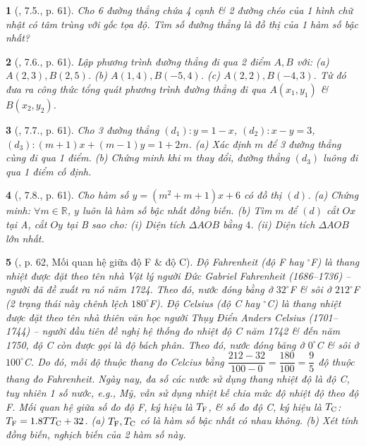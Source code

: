\documentclass{article}
\newtheorem{baitoan}{}
\begin{document}
\begin{baitoan}[\cite{Binh_boi_duong_Toan_9_tap_1}, 7.5., p. 61]
	Cho 6 đường thẳng chứa 4 cạnh \& 2 đường chéo của 1 hình chữ nhật có tâm trùng với gốc tọa độ. Tìm số đường thẳng là đồ thị của 1 hàm số bậc nhất?
\end{baitoan}

\begin{baitoan}[\cite{Binh_boi_duong_Toan_9_tap_1}, 7.6., p. 61]
	Lập phương trình đường thẳng đi qua 2 điểm $A,B$ với: (a) $A(2,3),B(2,5)$. (b) $A(1,4),B(-5,4)$. (c) $A(2,2),B(-4,3)$. Từ đó đưa ra công thức tổng quát phương trình đường thẳng đi qua $A(x_1,y_1)$ \& $B(x_2,y_2)$.
\end{baitoan}

\begin{baitoan}[\cite{Binh_boi_duong_Toan_9_tap_1}, 7.7., p. 61]
	Cho 3 đường thẳng $(d_1):y = 1 - x$, $(d_2):x - y = 3$, $(d_3):(m + 1)x + (m - 1)y = 1 + 2m$. (a) Xác định $m$ để 3 đường thẳng cùng đi qua 1 điểm. (b) Chứng minh khi $m$ thay đổi, đường thẳng $(d_3)$ luông đi qua 1 điểm cố định.
\end{baitoan}

\begin{baitoan}[\cite{Binh_boi_duong_Toan_9_tap_1}, 7.8., p. 61]
	Cho hàm số $y = (m^2 + m + 1)x + 6$ có đồ thị $(d)$. (a) Chứng minh: $\forall m\in\mathbb{R}$, $y$ luôn là hàm số bậc nhất đồng biến. (b) Tìm $m$ để $(d)$ cắt $Ox$ tại A, cắt $Oy$ tại B sao cho: (i) Diện tích $\Delta AOB$ bằng $4$. (ii) Diện tích $\Delta AOB$ lớn nhất.
\end{baitoan}

\begin{baitoan}[\cite{Binh_boi_duong_Toan_9_tap_1}, p. 62, Mối quan hệ giữa độ F \& độ C]
	Độ Fahrenheit (độ {\rm F} hay ${}^\circ${\rm F}) là thang nhiệt được đặt theo tên nhà Vật lý người Đức Gabriel Fahrenheit (1686--1736) -- người đã đề xuất ra nó năm 1724. Theo đó, nước đóng bằng ở $32^\circ${\rm F} \& sôi ở $212^\circ${\rm F} (2 trạng thái này chênh lệch $180^\circ${\rm F}). Độ Celsius (độ {\rm C} hay ${}^\circ${\rm C}) là thang nhiệt được đặt theo tên nhà thiên văn học người Thụy Điển Anders Celsius (1701--1744) -- người đầu tiên đề nghị hệ thống đo nhiệt độ {\rm C} năm 1742 \& đến năm 1750, độ {\rm C} còn được gọi là độ bách phân. Theo đó, nước đóng băng ở $0^\circ${\rm C} \& sôi ở $100^\circ${\rm C}. Do đó, mỗi độ thuộc thang đo Celcius bằng $\dfrac{212 - 32}{100 - 0} = \dfrac{180}{100} = \dfrac{9}{5}$ độ thuộc thang đo Fahrenheit. Ngày nay, đa số các nước sử dụng thang nhiệt độ là độ {\rm C}, tuy nhiên 1 số nước, e.g., Mỹ, vẫn sử dụng nhiệt kế chia mức độ nhiệt độ theo độ {\rm F}. Mối quan hệ giữa số đo độ {\rm F}, ký hiệu là $T_{\rm F}$, \& số đo độ {\rm C}, ký hiệu là $T_{\rm C}$: $T_{\rm F} = 1.8TT_{\rm C} + 32$. (a) $T_{\rm F},T_{\rm C}$ có là hàm số bậc nhất có nhau không. (b) Xét tính đồng biến, nghịch biến của 2 hàm số này.
\end{baitoan}
\end{document}
